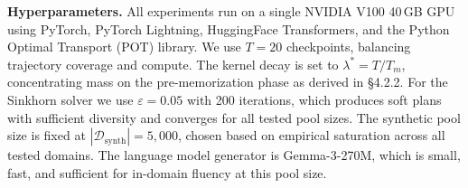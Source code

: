 \textbf{Hyperparameters.}
All experiments run on a single NVIDIA V100 40\,GB GPU using PyTorch, PyTorch Lightning, HuggingFace Transformers, and the Python Optimal Transport (POT) library.
We use $T = 20$ checkpoints, balancing trajectory coverage and compute.
The kernel decay is set to $\lambda^* = T / T_m$, concentrating mass on the pre-memorization phase as derived in \S4.2.2.
For the Sinkhorn solver we use $\varepsilon = 0.05$ with 200 iterations, which produces soft plans with sufficient diversity and converges for all tested pool sizes.
The synthetic pool size is fixed at $|\mathcal{D}_\text{synth}| = 5{,}000$, chosen based on empirical saturation across all tested domains.
The language model generator is Gemma-3-270M, which is small, fast, and sufficient for in-domain fluency at this pool size.
